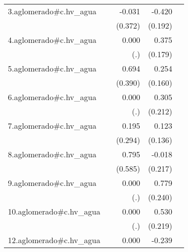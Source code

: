 {\begin{longtable}{l*{4}{D{.}{.}{-1}}}
\addlinespace
3.aglomerado#c.hv\_agua&                     &      -0.031         &      -0.420\sym{*}  &                     \\
            &                     &     (0.372)         &     (0.192)         &                     \\
\addlinespace
4.aglomerado#c.hv\_agua&                     &       0.000         &       0.375\sym{*}  &                     \\
            &                     &         (.)         &     (0.179)         &                     \\
\addlinespace
5.aglomerado#c.hv\_agua&                     &       0.694         &       0.254         &                     \\
            &                     &     (0.390)         &     (0.160)         &                     \\
\addlinespace
6.aglomerado#c.hv\_agua&                     &       0.000         &       0.305         &                     \\
            &                     &         (.)         &     (0.212)         &                     \\
\addlinespace
7.aglomerado#c.hv\_agua&                     &       0.195         &       0.123         &                     \\
            &                     &     (0.294)         &     (0.136)         &                     \\
\addlinespace
8.aglomerado#c.hv\_agua&                     &       0.795         &      -0.018         &                     \\
            &                     &     (0.585)         &     (0.217)         &                     \\
\addlinespace
9.aglomerado#c.hv\_agua&                     &       0.000         &       0.779\sym{**} &                     \\
            &                     &         (.)         &     (0.240)         &                     \\
\addlinespace
10.aglomerado#c.hv\_agua&                     &       0.000         &       0.530\sym{*}  &                     \\
            &                     &         (.)         &     (0.219)         &                     \\
\addlinespace
12.aglomerado#c.hv\_agua&                     &       0.000         &      -0.239         &                     \\

\end{longtable}}
